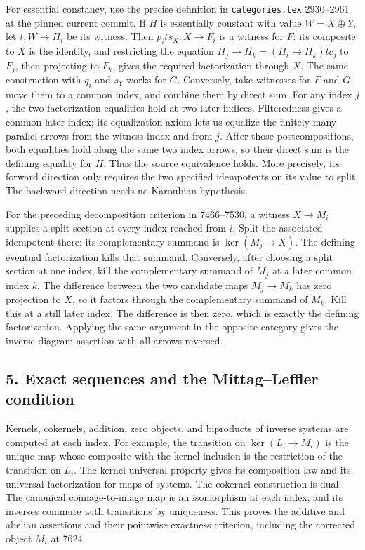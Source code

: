 \documentclass[11pt]{article}
\begin{document}
For essential constancy, use the precise definition in \texttt{categories.tex} 2930--2961 at the pinned current commit. If \(H\) is essentially constant with value \(W=X\oplus Y\), let \(t:W\to H_i\) be its witness. Then \(p_i t s_X:X\to F_i\) is a witness for \(F\): its composite to \(X\) is the identity, and restricting the equation \(H_j\to H_k=(H_i\to H_k)t c_j\) to \(F_j\), then projecting to \(F_k\), gives the required factorization through \(X\). The same construction with \(q_i\) and \(s_Y\) works for \(G\). Conversely, take witnesses for \(F\) and \(G\), move them to a common index, and combine them by direct sum. For any index \(j\), the two factorization equalities hold at two later indices. Filteredness gives a common later index; its equalization axiom lets us equalize the finitely many parallel arrows from the witness index and from \(j\). After those postcompositions, both equalities hold along the same two index arrows, so their direct sum is the defining equality for \(H\). Thus the source equivalence holds. More precisely, its forward direction only requires the two specified idempotents on its value to split. The backward direction needs no Karoubian hypothesis.

For the preceding decomposition criterion in 7466--7530, a witness \(X\to M_i\) supplies a split section at every index reached from \(i\). Split the associated idempotent there; its complementary summand is \(\ker(M_j\to X)\). The defining eventual factorization kills that summand. Conversely, after choosing a split section at one index, kill the complementary summand of \(M_j\) at a later common index \(k\). The difference between the two candidate maps \(M_j\to M_k\) has zero projection to \(X\), so it factors through the complementary summand of \(M_k\). Kill this at a still later index. The difference is then zero, which is exactly the defining factorization. Applying the same argument in the opposite category gives the inverse-diagram assertion with all arrows reversed.

\subsection{5. Exact sequences and the Mittag--Leffler condition}\label{note-09-exact-sequences-and-the-mittagleffler-condition}

Kernels, cokernels, addition, zero objects, and biproducts of inverse systems are computed at each index. For example, the transition on \(\ker(L_i\to M_i)\) is the unique map whose composite with the kernel inclusion is the restriction of the transition on \(L_i\). The kernel universal property gives its composition law and its universal factorization for maps of systems. The cokernel construction is dual. The canonical coimage-to-image map is an isomorphism at each index, and its inverses commute with transitions by uniqueness. This proves the additive and abelian assertions and their pointwise exactness criterion, including the corrected object \(M_i\) at 7624.
\end{document}

